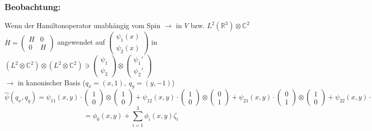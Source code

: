 \documentclass[twoside,a4paper]{scrartcl}
\newcommand{\R}{\mathbb{R}}
\newcommand{\C}{\mathbb{C}}
\renewcommand{\1}{\mathds{1}}
\newcommand{\ra}{\rightarrow}
\renewcommand{\R}{\mathbb{R}}
\renewcommand{\C}{\mathbb{C}}
\begin{document}
\subsubsection*{Beobachtung:}
Wenn der Hamiltonoperator unabhängig vom Spin $\ra$ in $V$ bzw. $L^2(\R^3)\otimes \C^2$\\
$\overline{H}=\begin{pmatrix}H & 0 \\ 0 & H \end{pmatrix}$ angewendet auf $\begin{pmatrix}\psi_1(x) \\ \psi_2(x) \end{pmatrix}$ in $(L^2\otimes \C^2)\otimes(L^2\otimes \C^2) \ni \begin{pmatrix}\psi_1 \\ \psi_2 \end{pmatrix} \otimes \begin{pmatrix}\psi_1' \\ \psi_2' \end{pmatrix}$\\
$\ra$ in kanonischer Basis ($q_x=(x,1), \ q_y=(y,-1)$)
$$\hat \psi(q_x,q_y)=\psi_{11}(x,y)\cdot \begin{pmatrix}1 \\ 0 \end{pmatrix}\otimes \begin{pmatrix}1 \\ 0 \end{pmatrix}+\psi_{12}(x,y)\cdot \begin{pmatrix}1 \\ 0 \end{pmatrix}\otimes \begin{pmatrix}0 \\ 1 \end{pmatrix}+\psi_{21}(x,y)\cdot \begin{pmatrix}0 \\ 1 \end{pmatrix}\otimes \begin{pmatrix}1 \\ 0 \end{pmatrix}+\psi_{22}(x,y)\cdot\begin{pmatrix}0 \\ 1 \end{pmatrix}\otimes \begin{pmatrix}0 \\ 1 \end{pmatrix}$$
$$=\phi_0(x,y)+\sum_{i=1}^3 \phi_i(x,y)\zeta_i$$
\end{document}

